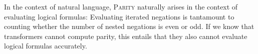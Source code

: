 \documentclass[11pt,a4paper]{article}
\begin{document}
In the context of natural language, \textsc{Parity} naturally arises in the context of evaluating logical formulas:
Evaluating iterated negations is tantamount to counting whether the number of nested negations is even or odd.
If we know that transformers cannot compute parity, this entails that they also cannot evaluate logical formulas accurately.










%
%
\end{document}
